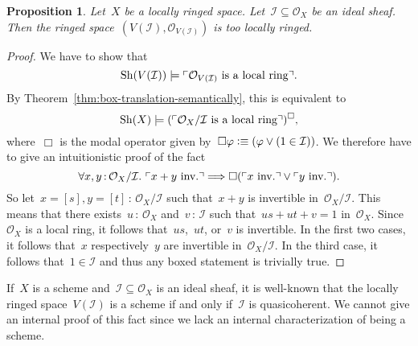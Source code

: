 \documentclass[10pt]{amsart}
\makeatletter
\theoremstyle{definition}
\theoremstyle{plain}
\newtheorem{prop}[defn]{Proposition}
\theoremstyle{remark}
\renewcommand{\O}{\mathcal{O}}
\newcommand{\I}{\mathcal{I}}
\newcommand{\Sh}{\mathrm{Sh}}
\newcommand{\?}{\,{:}\,}
\renewcommand{\_}{\mathpunct{.}\,}
\newcommand{\speak}[1]{\ulcorner\text{\textnormal{#1}}\urcorner}
\newcommand{\inv}{inv.\@}
\newcommand{\defequiv}{\vcentcolon\equiv}
\makeatother
\begin{document}
\begin{prop}Let~$X$ be a locally ringed space. Let~$\I \subseteq \O_X$ be an
ideal sheaf. Then the ringed space~$(V(\I), \O_{V(\I)})$ is too locally
ringed.\end{prop}
\begin{proof}We have to show that
\[ \Sh(V(\I)) \models \speak{$\O_{V(\I)}$ is a local ring}. \]
By Theorem~\ref{thm:box-translation-semantically}, this is equivalent to
\[ \Sh(X) \models (\speak{$\O_X/\I$ is a local ring})^\Box, \]
where~$\Box$ is the modal operator given by~$\Box\varphi \defequiv (\varphi \vee
(1 \in \I))$. We therefore have to give an intuitionistic proof of the fact
\[ \forall x,y\?\O_X/\I\_ \speak{$x+y$ \inv} \Longrightarrow
  \Box(\speak{$x$ \inv} \vee \speak{$y$ \inv}). \]
So let~$x = [s], y = [t] \? \O_X/\I$ such that~$x + y$ is invertible
in~$\O_X/\I$. This means that there exists~$u\?\O_X$ and~$v\?\I$ such that~$us
+ ut + v = 1$ in~$\O_X$. Since~$\O_X$ is a local ring, it follows
that~$us$,~$ut$, or~$v$ is invertible. In the first two cases, it follows
that~$x$ respectively~$y$ are invertible in~$\O_X/\I$. In the third case, it
follows that~$1 \in \I$ and thus any boxed statement is trivially true.
\end{proof}

If~$X$ is a scheme and~$\I \subseteq \O_X$ is an ideal sheaf, it is well-known
that the locally ringed space~$V(\I)$ is a scheme if and only if~$\I$ is
quasicoherent. We cannot give an internal proof of this fact since we lack an
internal characterization of being a scheme.
\end{document}
